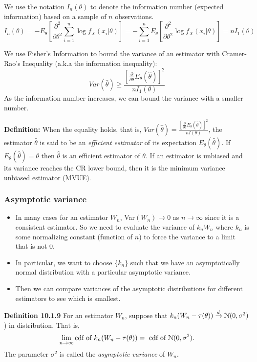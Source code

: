 \documentclass[11pt,]{article}
\def\thetahat{{\widehat\theta}}
\def\Nsc{{\cal N}}
\def\sumin{\sum_{i=1}^n}
\begin{document}
We use the notation \(I_n(\theta)\) to denote the information number
(expected information) based on a sample of \(n\) observations.
\[I_n(\theta) = - E_\theta\left[\frac{\partial^2}{\partial \theta^2} \sumin \log f_X(x_i|\theta)\right]
=
- \sumin E_\theta\left[\frac{\partial^2}{\partial \theta^2}\log f_X(x_i|\theta)\right] = nI_1(\theta)\]

We use Fisher's Information to bound the variance of an estimator with
Cramer-Rao's Inequality (a.k.a the information inequality):
\[Var(\thetahat) \geq \frac{[\frac{\partial}{\partial\theta} E_\theta(\thetahat)]^2}{n I_1(\theta)}\]
As the information number increases, we can bound the variance with a
smaller number.

\noindent\textbf{Definition:} When the equality holds, that is,
\(Var(\thetahat) = \frac{[\frac{\partial}{\partial\theta} E_\theta(\thetahat)]^2}{n I(\theta)}\),
the estimator \(\thetahat\) is said to be an \emph{efficient estimator}
of its expectation \(E_\theta(\thetahat)\). If
\(E_\theta(\thetahat) = \theta\) then \(\thetahat\) is an efficient
estimator of \(\theta\). If an estimator is unbiased and its variance
reaches the CR lower bound, then it is the minimum variance unbiased
estimator (MVUE).

\hypertarget{asymptotic-variance}{%
\subsubsection{Asymptotic variance}\label{asymptotic-variance}}

\begin{itemize}
\item In many cases for an estimator $W_n$, Var$(W_n) \to 0$ as $n\to \infty$ since it is a consistent estimator. So we need to evaluate the variance of $k_n W_n$ where $k_n$ is some normalizing constant (function of $n$) to force the variance to a limit that is not 0.
\item In particular, we want to choose $\{ k_n\}$ such that we have an asymptotically normal distribution with a particular asymptotic variance.
\item Then we can compare variances of the asymptotic distributions for different estimators to see which is smallest.
\end{itemize}

\noindent\textbf{Definition 10.1.9} For an estimator \(W_n\), suppose
that \(k_n (W_n - \tau(\theta)) \xrightarrow{d} \Nsc(0,\sigma^2)\)) in
distribution. That is, \[
\lim_{n\to\infty} \mbox{cdf of } k_n (W_n - \tau(\theta)) = \mbox{ cdf of } \Nsc(0,\sigma^2).\]
The parameter \(\sigma^2\) is called the \emph{asymptotic variance} of
\(W_n\).
\end{document}
